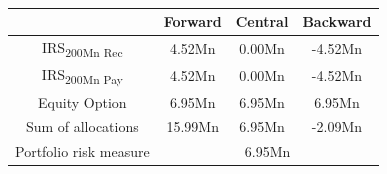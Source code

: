 \documentclass[../Thesis_AHoecherl.tex]{subfiles}
\begin{document}
    \begin{table}[htbp]
        \label{tab:IM perfect hedge}
        \centering
            \begin{tabular}{c|c|c|c}
                & Forward & Central & Backward \\
                \toprule
                IRS\textsubscript{200Mn Rec} & 4.52Mn & 0.00Mn & -4.52Mn \\
                \midrule
                IRS\textsubscript{200Mn Pay} & 4.52Mn & 0.00Mn & -4.52Mn \\
                \midrule
                Equity Option & 6.95Mn & 6.95Mn & 6.95Mn \\
                \bottomrule
                Sum of allocations & 15.99Mn & 6.95Mn & -2.09Mn \\
                \midrule
                Portfolio risk measure & \multicolumn{3}{c}{6.95Mn}  \\
            \end{tabular}%
        \caption{}
    \end{table}
\end{document}
